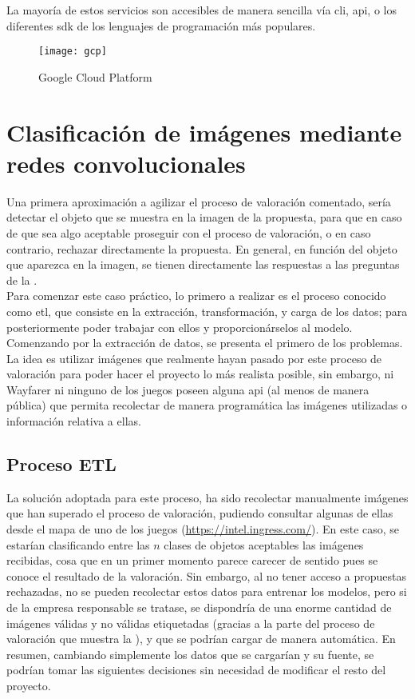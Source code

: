 			La mayoría de estos servicios son accesibles de manera sencilla vía \gls{cli}, \gls{api}, o los diferentes \gls{sdk} de los lenguajes de programación más populares. 
			
			\begin{figure}[!h]
				\centering
				\texttt{[image: gcp]}
				\caption{Google Cloud Platform}
				\label{fig:gcp}
			\end{figure}
			
			

	\section{Clasificación de imágenes mediante redes convolucionales}
	
		Una primera aproximación a agilizar el proceso de valoración comentado, sería detectar el objeto que se muestra en la imagen de la propuesta, para que en caso de que sea algo aceptable proseguir con el proceso de valoración, o en caso contrario, rechazar directamente la propuesta. En general, en función del objeto que aparezca en la imagen, se tienen directamente las respuestas a las preguntas de la . \\
		
		Para comenzar este caso práctico, lo primero a realizar es el proceso conocido como \gls{etl}, que consiste en la extracción, transformación, y carga de los datos; para posteriormente poder trabajar con ellos y proporcionárselos al modelo. Comenzando por la extracción de datos, se presenta el primero de los problemas. La idea es utilizar imágenes que realmente hayan pasado por este proceso de valoración para poder hacer el proyecto lo más realista posible, sin embargo, ni Wayfarer ni ninguno de los juegos poseen alguna \gls{api} (al menos de manera pública) que permita recolectar de manera programática las imágenes utilizadas o información relativa a ellas. 
		
		\subsection{Proceso ETL}
		
			La solución adoptada para este proceso, ha sido recolectar manualmente imágenes que han superado el proceso de valoración, pudiendo consultar algunas de ellas desde el mapa de uno de los juegos (\url{https://intel.ingress.com/}). En este caso, se estarían clasificando entre las $n$ clases de objetos aceptables las imágenes recibidas, cosa que en un primer momento parece carecer de sentido pues se conoce el resultado de la valoración. Sin embargo, al no tener acceso a propuestas rechazadas, no se pueden recolectar estos datos para entrenar los modelos, pero si de la empresa responsable se tratase, se dispondría de una enorme cantidad de imágenes válidas y no válidas etiquetadas (gracias a la parte del proceso de valoración que muestra la ), y que se podrían cargar de manera automática. En resumen, cambiando simplemente los datos que se cargarían y su fuente, se podrían tomar las siguientes decisiones sin necesidad de modificar el resto del proyecto.  
			

